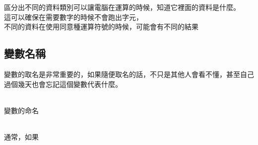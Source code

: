 \documentclass{article}
\begin{document}
\begin{large}
    區分出不同的資料類別可以讓電腦在運算的時候，知道它裡面的資料是什麼。\\
    這可以確保在需要數字的時候不會跑出字元，\\
    不同的資料在使用同意種運算符號的時候，可能會有不同的結果\\



    \subsection{變數名稱}
    變數的取名是非常重要的，如果隨便取名的話，不只是其他人會看不懂，甚至自己過個幾天也會忘記這個變數代表什麼。\\
    \\
    \begin{LARGE}
    變數的命名\\
    \end{LARGE}
    \\
    通常，如果




\end{large}
\end{document}
